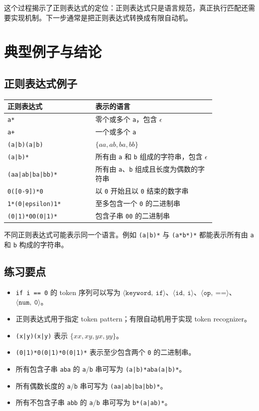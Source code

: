 \documentclass[11pt,a4paper]{article}
\newcommand{\token}[2]{\ensuremath{\langle \texttt{#1},\ \texttt{#2}\rangle}}
\newcommand{\code}[1]{\texttt{#1}}
\begin{document}
这个过程揭示了正则表达式的定位：正则表达式只是语言规范，真正执行匹配还需要实现机制。下一步通常是把正则表达式转换成有限自动机。

\section{典型例子与结论}

\subsection{正则表达式例子}

\begin{center}
\begin{tabular}{>{\raggedright\arraybackslash}p{0.35\linewidth} >{\raggedright\arraybackslash}p{0.48\linewidth}}
\toprule
\textbf{正则表达式} & \textbf{表示的语言} \\
\midrule
\code{a*} & 零个或多个 \code{a}，包含 $\epsilon$ \\
\code{a+} & 一个或多个 \code{a} \\
\code{(a|b)(a|b)} & $\{aa,ab,ba,bb\}$ \\
\code{(a|b)*} & 所有由 \code{a} 和 \code{b} 组成的字符串，包含 $\epsilon$ \\
\code{(aa|ab|ba|bb)*} & 所有由 \code{a}、\code{b} 组成且长度为偶数的字符串 \\
\code{0([0-9])*0} & 以 \code{0} 开始且以 \code{0} 结束的数字串 \\
\code{1*(0|epsilon)1*} & 至多包含一个 \code{0} 的二进制串 \\
\code{(0|1)*00(0|1)*} & 包含子串 \code{00} 的二进制串 \\
\bottomrule
\end{tabular}
\end{center}

不同正则表达式可能表示同一个语言。例如 \code{(a|b)*} 与 \code{(a*b*)*} 都能表示所有由 \code{a} 和 \code{b} 构成的字符串。

\subsection{练习要点}

\begin{itemize}
  \item \code{if i == 0} 的 token 序列可以写为 $\token{keyword}{if}$、$\token{id}{i}$、$\token{op}{==}$、$\token{num}{0}$。
  \item 正则表达式用于指定 token pattern；有限自动机用于实现 token recognizer。
  \item \code{(x|y)(x|y)} 表示 $\{xx,xy,yx,yy\}$。
  \item \code{(0|1)*0(0|1)*0(0|1)*} 表示至少包含两个 \code{0} 的二进制串。
  \item 所有包含子串 \code{aba} 的 \code{a}/\code{b} 串可写为 \code{(a|b)*aba(a|b)*}。
  \item 所有偶数长度的 \code{a}/\code{b} 串可写为 \code{(aa|ab|ba|bb)*}。
  \item 所有不包含子串 \code{abb} 的 \code{a}/\code{b} 串可写为 \code{b*(a|ab)*}。
\end{itemize}
\end{document}
